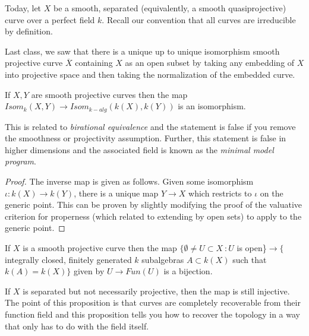 Today, let $X$ be a smooth, separated (equivalently, a smooth quasiprojective) curve over a perfect field $k$. Recall our convention that all curves are irreducible by definition. 

Last class, we saw that there is a unique up to unique isomorphism smooth projective curve $\overline{X}$ containing $X$ as an open subset by taking any embedding of $X$ into projective space and then taking the normalization of the embedded curve. 

\begin{prop}
If $X, Y$ are smooth projective curves then the map $Isom_k(X, Y) \to Isom_{k-alg}(k(X), k(Y))$ is an isomorphism.
\end{prop}

This is related to \textit{birational equivalence} and the statement is false if you remove the smoothness or projectivity assumption. Further, this statement is false in higher dimensions and the associated field is known as the \textit{minimal model program}.

\begin{proof}
The inverse map is given as follows. Given some isomorphism $\iota : k(X) \to k(Y)$, there is a unique map $Y \to X$ which restricts to $\iota$ on the generic point. This can be proven by slightly modifying the proof of the valuative criterion for properness (which related to extending by open sets) to apply to the generic point. 
\end{proof}

\begin{prop}
If $X$ is a smooth projective curve then the map $\{\emptyset \neq U \subset X\ : U$ is open\}$ \to \{$integrally closed, finitely generated $k$ subalgebras $A\subset k(X)$ such that $k(A) = k(X)\}$ given by $U \to Fun(U)$ is a bijection.
\end{prop}

\begin{rem}
If $X$ is separated but not necessarily projective, then the map is still injective. The point of this proposition is that curves are completely recoverable from their function field and this proposition tells you how to recover the topology in a way that only has to do with the field itself. 
\end{rem}

